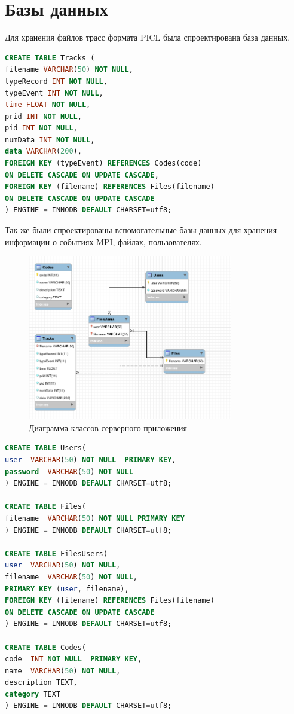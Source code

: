 \section{Базы данных}
Для хранения файлов трасс формата PICL была спроектирована база данных.
\begin{lstlisting}[language=SQL]
CREATE TABLE Tracks ( 
filename VARCHAR(50) NOT NULL,
typeRecord INT NOT NULL,
typeEvent INT NOT NULL,
time FLOAT NOT NULL,
prid INT NOT NULL,
pid INT NOT NULL,
numData INT NOT NULL,
data VARCHAR(200),
FOREIGN KEY (typeEvent) REFERENCES Codes(code) 
ON DELETE CASCADE ON UPDATE CASCADE,
FOREIGN KEY (filename) REFERENCES Files(filename) 
ON DELETE CASCADE ON UPDATE CASCADE
) ENGINE = INNODB DEFAULT CHARSET=utf8;
\end{lstlisting}
Так же были спроектированы вспомогательные базы данных для хранения информации о событиях MPI, файлах, пользователях.
\begin{figure}[h!]
	\centering
	\includegraphics[width=0.8\textwidth]{img/img7.png}
	\caption{Диаграмма классов серверного приложения}
	\label{fig:spire12}
\end{figure}

\begin{lstlisting}[language=SQL]
CREATE TABLE Users(
user  VARCHAR(50) NOT NULL  PRIMARY KEY,
password  VARCHAR(50) NOT NULL
) ENGINE = INNODB DEFAULT CHARSET=utf8;

CREATE TABLE Files(
filename  VARCHAR(50) NOT NULL PRIMARY KEY
) ENGINE = INNODB DEFAULT CHARSET=utf8;

CREATE TABLE FilesUsers(
user  VARCHAR(50) NOT NULL,
filename  VARCHAR(50) NOT NULL,
PRIMARY KEY (user, filename), 
FOREIGN KEY (filename) REFERENCES Files(filename)
ON DELETE CASCADE ON UPDATE CASCADE 
) ENGINE = INNODB DEFAULT CHARSET=utf8;

CREATE TABLE Codes(
code  INT NOT NULL  PRIMARY KEY,
name  VARCHAR(50) NOT NULL,
description TEXT,
category TEXT
) ENGINE = INNODB DEFAULT CHARSET=utf8;

\end{lstlisting} 

